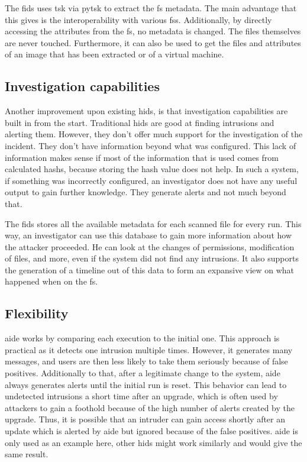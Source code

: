 The \gls{fids} uses \gls{tsk} via \gls{pytsk} to extract the \gls{fs} \gls{metadata}. The main advantage that this gives is the interoperability with various \glspl{fs}. Additionally, by directly accessing the attributes from the \gls{fs}, no \gls{metadata} is changed. The files themselves are never touched. Furthermore, it can also be used to get the files and attributes of an image that has been extracted or of a virtual machine. 

\subsection{Investigation capabilities}
\label{sec:investigation:capabilities}

Another improvement upon existing \gls{hids}, is that investigation capabilities are built in from the start. Traditional \gls{hids} are good at finding \glspl{intrusion} and alerting them. However, they don't offer much support for the investigation of the incident. They don't have information beyond what was configured. This lack of information makes sense if most of the information that is used comes from calculated \glspl{hash}, because storing the hash value does not help. In such a system, if something was incorrectly configured, an investigator does not have any useful output to gain further knowledge. They generate alerts and not much beyond that.

The \gls{fids} stores all the available \gls{metadata} for each scanned file for every run. This way, an investigator can use this database to gain more information about how the attacker proceeded. He can look at the changes of permissions, modification of files, and more, even if the system did not find any \glspl{intrusion}. It also supports the generation of a timeline out of this data to form an expansive view on what happened when on the \gls{fs}. 

\subsection{Flexibility}

\Gls{aide} works by comparing each execution to the initial one. This approach is practical as it detects one \gls{intrusion} multiple times. However, it generates many messages, and users are then less likely to take them seriously because of false positives. Additionally to that, after a legitimate change to the system, \gls{aide} always generates alerts until the initial run is reset. This behavior can lead to undetected \glspl{intrusion} a short time after an upgrade, which is often used by attackers to gain a foothold because of the high number of alerts created by the upgrade. Thus, it is possible that an intruder can gain access shortly after an update which is alerted by \gls{aide} but ignored because of the false positives. \Gls{aide} is only used as an example here, other \gls{hids} might work similarly and would give the same result.

